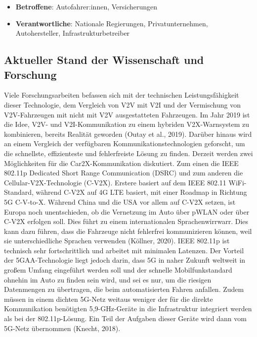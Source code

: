 \documentclass[
]{book}
\providecommand{\tightlist}{%
  \setlength{\itemsep}{0pt}\setlength{\parskip}{0pt}}
\begin{document}
\begin{itemize}
\tightlist
\item
  \textbf{Betroffene}: Autofahrer:innen, Versicherungen
\item
  \textbf{Verantwortliche}: Nationale Regierungen, Privatunternehmen, Autohersteller, Infrastrukturbetreiber
\end{itemize}

\hypertarget{aktueller-stand-der-wissenschaft-und-forschung-18}{%
\subsection*{Aktueller Stand der Wissenschaft und Forschung}\label{aktueller-stand-der-wissenschaft-und-forschung-18}}

Viele Forschungsarbeiten befassen sich mit der technischen Leistungsfähigkeit dieser Technologie, dem Vergleich von V2V mit V2I und der Vermischung von V2V-Fahrzeugen mit nicht mit V2V ausgestatteten Fahrzeugen. Im Jahr 2019 ist die Idee, V2V- und V2I-Kommunikation zu einem hybriden V2X-Warnsystem zu kombinieren, bereits Realität geworden (Outay et al., 2019).
Darüber hinaus wird an einem Vergleich der verfügbaren Kommunikationstechnologien geforscht, um die schnellste, effizienteste und fehlerfreiste Lösung zu finden. Derzeit werden zwei Möglichkeiten für die Car2X-Kommunikation diskutiert. Zum einen die IEEE 802.11p Dedicated Short Range Communication (DSRC) und zum anderen die Cellular-V2X-Technologie (C-V2X). Erstere basiert auf dem IEEE 802.11 WiFi-Standard, während C-V2X auf 4G LTE basiert, mit einer Roadmap in Richtung 5G C-V-to-X. Während China und die USA vor allem auf C-V2X setzen, ist Europa noch unentschieden, ob die Vernetzung im Auto über pWLAN oder über C-V2X erfolgen soll. Dies führt zu einem internationalen Sprachenwirrwarr. Dies kann dazu führen, dass die Fahrzeuge nicht fehlerfrei kommunizieren können, weil sie unterschiedliche Sprachen verwenden (Köllner, 2020).
IEEE 802.11p ist technisch sehr fortschrittlich und arbeitet mit minimalen Latenzen. Der Vorteil der 5GAA-Technologie liegt jedoch darin, dass 5G in naher Zukunft weltweit in großem Umfang eingeführt werden soll und der schnelle Mobilfunkstandard ohnehin im Auto zu finden sein wird, und sei es nur, um die riesigen Datenmengen zu übertragen, die beim automatisierten Fahren anfallen. Zudem müssen in einem dichten 5G-Netz weitaus weniger der für die direkte Kommunikation benötigten 5,9-GHz-Geräte in die Infrastruktur integriert werden als bei der 802.11p-Lösung. Ein Teil der Aufgaben dieser Geräte wird dann vom 5G-Netz übernommen (Knecht, 2018).
\end{document}
